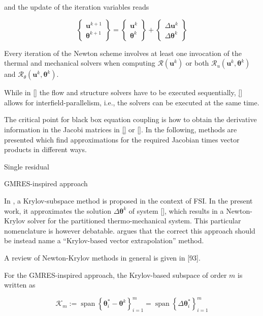 and the update of the iteration variables reads

$$
\left\{\begin{array}{l}
\mathbf{u}^{k+1} \\
\boldsymbol{\theta}^{k+1}
\end{array}\right\}=\left\{\begin{array}{l}
\mathbf{u}^{k} \\
\boldsymbol{\theta}^{k}
\end{array}\right\}+\left\{\begin{array}{c}
\Delta \mathbf{u}^{k} \\
\Delta \boldsymbol{\theta}^{k}
\end{array}\right\}
$$

Every iteration of the Newton scheme involves at least one invocation of the thermal and mechanical solvers when computing $\mathcal{R}\left(\mathbf{u}^{k}\right)$ or both $\mathcal{R}_{u}\left(\mathbf{u}^{k}, \boldsymbol{\theta}^{k}\right)$ and $\mathcal{R}_{\theta}\left(\mathbf{u}^{k}, \boldsymbol{\theta}^{k}\right)$.

While in \eqref{} the flow and structure solvers have to be executed sequentially, \eqref{} allows for interfield-parallelism, i.e., the solvers can be executed at the same time.

The critical point for black box equation coupling is how to obtain the derivative information in the Jacobi matrices in \eqref{} or \eqref{}. In the following, methods are presented which find approximations for the required Jacobian times vector products in different ways.

 Single residual

 GMRES-inspired approach

In \cite{michler}, a Krylov-subspace method is proposed in the context of FSI. In the present work, it approximates the solution $\Delta \boldsymbol{\theta}^{k}$ of system \eqref{}, which results in a Newton-Krylov solver for the partitioned thermo-mechanical system. This particular nomenclature is however debatable. \cite{kutler} argues that the correct this approach should be instead name a “Krylov-based vector extrapolation” method.

A review of Newton-Krylov methods in general is given in [93].

For the GMRES-inspired approach, the Krylov-based subspace of order $m$ is written as

$$
\mathcal{K}_{m}:=\operatorname{span}\left\{\boldsymbol{\theta}^{*}_i-\boldsymbol{\theta}^{k}\right\}_{i=1}^{m}=\operatorname{span}\left\{\Delta \boldsymbol{\theta}^*_{i}\right\}_{i=1}^{m}
$$

